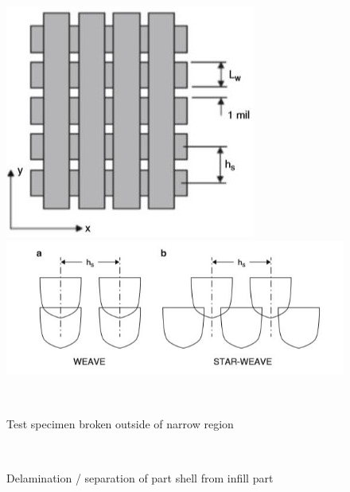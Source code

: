 \documentclass[a4paper, twoside, 11pt]{report}
\begin{document}
%
\begin{figure}[!t]
  \centering
  \begin{minipage}[b]{0.45\textwidth}
    \includegraphics[width=\textwidth]{weave1}
  \end{minipage}
  \hfill
  \begin{minipage}[b]{0.45\textwidth}
    \includegraphics[width=\textwidth]{weave2}
  \end{minipage}
  \\[1pt]
  \begin{minipage}[t]{0.45\textwidth}
    \caption{Test specimen broken outside of narrow region}
  \end{minipage}
  \hfill
  \begin{minipage}[t]{0.45\textwidth}
    \caption{Delamination / separation of part shell from infill part}
  \end{minipage}
  \\[5pt]

\end{figure}
\end{document}
